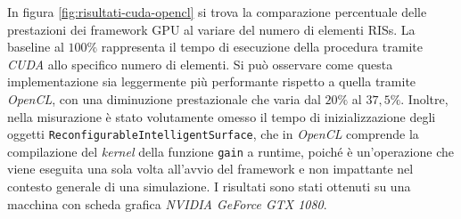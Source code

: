 In figura \ref{fig:risultati-cuda-opencl} si trova la comparazione percentuale
delle prestazioni dei framework GPU al variare del numero di elementi RISs. La baseline
al $100\%$ rappresenta il tempo di esecuzione della procedura tramite \textit{CUDA}
allo specifico numero di elementi. Si può osservare come questa implementazione sia
leggermente più performante rispetto a quella tramite \textit{OpenCL}, con una diminuzione
prestazionale che varia dal $20\%$ al $37,5\%$. Inoltre, nella misurazione è stato
volutamente omesso il tempo di inizializzazione degli oggetti \texttt{ReconfigurableIntelligentSurface},
che in \textit{OpenCL} comprende la compilazione del \textit{kernel} della funzione
\texttt{gain} a runtime, poiché è un'operazione che viene eseguita una sola volta
all'avvio del framework e non impattante nel contesto generale di una simulazione.
I risultati sono stati ottenuti su una macchina con scheda grafica \textit{NVIDIA
GeForce GTX 1080}.


